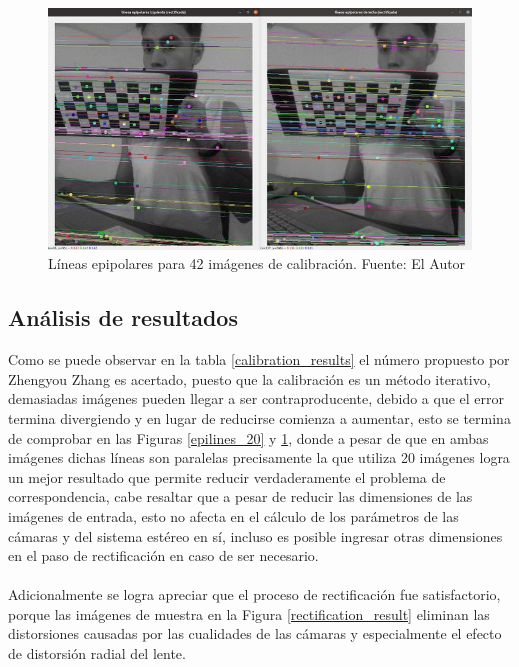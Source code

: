 \begin{figure}[H]
    \centering
    \includegraphics[scale=0.3]{Recursos/epilines_42_calibration_images.jpg}
    \caption[Líneas epipolares para 42 imágenes de calibración.]{Líneas epipolares para 42 imágenes de calibración. {\footnotesize Fuente: El Autor}}
    \label{epilines_42}
\end{figure}
\subsection{Análisis de resultados}
Como se puede observar en la tabla \ref{calibration_results} el número propuesto por Zhengyou Zhang \cite{Zhang2000} es acertado, puesto que la calibración es un método iterativo, demasiadas imágenes pueden llegar a ser contraproducente, debido a que el error termina divergiendo y en lugar de reducirse comienza a aumentar, esto se termina de comprobar en las Figuras \ref{epilines_20} y \ref{epilines_42}, donde a pesar de que en ambas imágenes dichas líneas son paralelas precisamente la que utiliza 20 imágenes logra un mejor resultado que permite reducir verdaderamente el problema de correspondencia, cabe resaltar que a pesar de reducir las dimensiones de las imágenes de entrada, esto no afecta en el cálculo de los parámetros de las cámaras y del sistema estéreo en sí, incluso es posible ingresar otras dimensiones en el paso de rectificación en caso de ser necesario. 
\\
\\
Adicionalmente se logra apreciar que el proceso de rectificación fue satisfactorio, porque las imágenes de muestra en la Figura \ref{rectification_result} eliminan las distorsiones causadas por las cualidades de las cámaras y especialmente el efecto de distorsión radial del lente.

